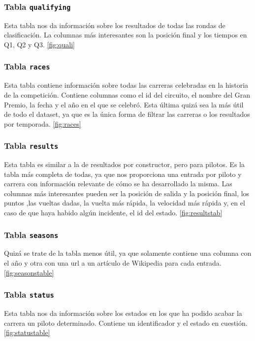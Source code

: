 \documentclass[12pt,twoside,titlepage]{report}
\begin{document}
\subsubsection{Tabla \texttt{qualifying}}

Esta tabla nos da información sobre los resultados de todas las rondas de clasificación. La columnas más interesantes son la posición final y los tiempos en Q1, Q2 y Q3. \ref{fig:quali}

\subsubsection{Tabla \texttt{races}}

Esta tabla contiene información sobre todas las carreras celebradas en la historia de la competición. Contiene columnas como el id del circuito, el nombre del Gran Premio, la fecha y el año en el que se celebró. Esta última quizá sea la más útil de todo el dataset, ya que es la única forma de filtrar las carreras o los resultados por temporada. \ref{fig:races}

\subsubsection{Tabla \texttt{results}}

Esta tabla es similar a la de resultados por constructor, pero para pilotos. Es la tabla más completa de todas, ya que nos proporciona una entrada por piloto y carrera con información relevante de cómo se ha desarrollado la misma. Las columnas más interesantes pueden ser la posición de salida y la posición final, los puntos ,las vueltas dadas, la vuelta más rápida, la velocidad más rápida y, en el caso de que haya habido algún incidente, el id del estado. \ref{fig:resultstab}

\subsubsection{Tabla \texttt{seasons}}

Quizá se trate de la tabla menos útil, ya que solamente contiene una columna con el año y otra con una url a un artículo de Wikipedia para cada entrada. \ref{fig:seasonstable}

\subsubsection{Tabla \texttt{status}}

Esta tabla nos da información sobre los estados en los que ha podido acabar la carrera un piloto determinado. Contiene un identificador y el estado en cuestión. \ref{fig:statustable}
\end{document}
